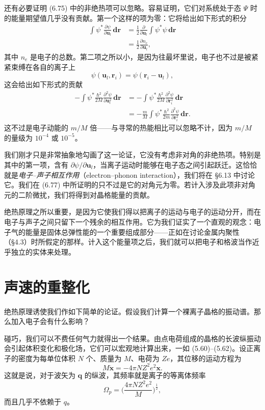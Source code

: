 还有必要证明 (6.75) 中的非绝热项可以忽略。容易证明，它们对系统处于态 $\Psi$ 时的能量期望值几乎没有贡献。第一个这样的项为零：它将给出如下形式的积分
\begin{align*}
\int\psi^{*}\frac{\partial\psi}{\partial\mathbf{u}_{l}}\,\mathbf{dr} &= \frac{1}{2}\frac{\partial}{\partial\mathbf{u}_{l}}\int\psi^{*}\psi\,\mathbf{dr} \\
&= \frac{1}{2}\frac{\partial n_{e}}{\partial\mathbf{u}_{l}}, \tag{6.77}
\end{align*}
其中 $n_{e}$ 是电子的总数。第二项之所以小，是因为往最坏里说，电子也不过是被紧紧束缚在各自的离子上
\begin{equation*}
\psi(\mathbf{u}_{l},\mathbf{r}_{i}) = \psi(\mathbf{r}_{i}-\mathbf{u}_{l}), \tag{6.78}
\end{equation*}
这会给出如下形式的贡献
\begin{align*}
-\int\psi^{*}\frac{\hbar^{2}}{2M}\frac{\partial^{2}\psi}{\partial\mathbf{u}_{l}^{2}}\,\mathbf{dr} &= -\int\psi^{*}\frac{\hbar^{2}}{2M}\frac{\partial^{2}\psi}{\partial\mathbf{r}_{i}^{2}}\,\mathbf{dr} \\
&= -\frac{m}{M}\int\psi^{*}\frac{\hbar^{2}}{2m}\frac{\partial^{2}\psi}{\partial\mathbf{r}_{i}^{2}}\,\mathbf{dr}. \tag{6.79}
\end{align*}
这不过是电子动能的 $m/M$ 倍——与寻常的热能相比可以忽略不计，因为 $m/M$ 的量级为 $10^{-4}$ 或 $10^{-5}$。

我们刚才只是非常抽象地勾画了这一论证，它没有考虑非对角的非绝热项。特别是其中的第一项，含有 $\partial\psi/\partial\mathbf{u}_{l}$，当离子运动时能够在电子态之间引起跃迁。这恰恰就是\emph{电子--声子相互作用}（electron--phonon interaction），我们将在 §6.13 中讨论它。我们在 (6.77) 中所证明的只不过是它的对角元为零。若计入涉及此项非对角元的二阶微扰，我们将得到对晶格能量的贡献。

绝热原理之所以重要，是因为它使我们得以把离子的运动与电子的运动分开，而在电子与声子之间只留下一个残余的相互作用。它为我们证实了一个直观的观念：电子气的能量是固体总弹性能的一个重要组成部分——正如在讨论金属内聚性（§4.3）时所假定的那样。计入这个能量项之后，我们就可以把电子和格波当作近乎独立的实体来处理。

\section{声速的重整化}

绝热原理诱使我们作如下简单的论证。假设我们计算一个裸离子晶格的振动谱。那么加入电子会有什么影响？

碰巧，我们可以不费任何气力就得出一个结果。由点电荷组成的晶格的长波纵振动会引起体积变化和极化场，它们可以宏观地计算出来，一如 (5.60)--(5.62)。设正离子的密度为每单位体积 $N$ 个、质量为 $M$、电荷为 $Ze$，其位移的运动方程为
\begin{equation*}
M\ddot{\mathbf{x}} = -4\pi NZ^{2}e^{2}\mathbf{x}. \tag{6.80}
\end{equation*}
这就是说，对于波矢为 $\mathbf{q}$ 的纵波，其频率就是离子的等离体频率
\begin{equation*}
\Omega_{p} = \biggl(\frac{4\pi NZ^{2}e^{2}}{M}\biggr)^{\frac{1}{2}}, \tag{6.81}
\end{equation*}
而且几乎不依赖于 $q$。

